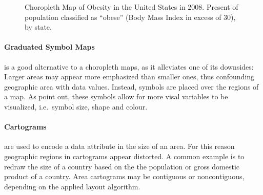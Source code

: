 \documentclass{article}
\begin{document}
\begin{figure}[h]
  \centering
  \caption{%
    Choropleth Map of Obesity in the United States in 2008.
    Present of population classified as ``obese'' (Body Mass Index in excess of 30), by state.
  }\label{fig:theory:choropleth}
\end{figure}

\paragraph{Graduated Symbol Maps} is a good alternative to a choropleth maps, as it alleviates one of its downsides:
Larger areas may appear more emphasized than smaller ones, thus confounding geographic area with data values.
Instead, symbols are placed over the regions of a map.
As \textcite{Heer2010} point out, these symbols allow for more visal variables to be visualized, i.e.\  symbol size, shape and colour.

\paragraph{Cartograms} are used to encode a data attribute in the size of an area.
For this reason geographic regions in cartograms appear distorted.
A common example is to redraw the size of a country based on the the population or gross domestic product of a country.
Area cartograms may be contiguous or noncontiguous, depending on the applied layout algorithm.
\end{document}
